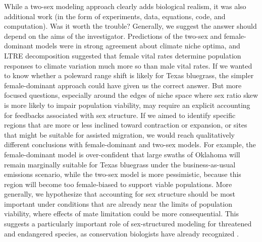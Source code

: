 \documentclass[9pt,twocolumn,twoside,lineno]{pnas-new}
\begin{document}
While a two-sex modeling approach clearly adds biological realism, it was also additional work (in the form of experiments, data, equations, code, and computation). 
Was it worth the trouble? 
Generally, we suggest the answer should depend on the aims of the investigator. 
Predictions of the two-sex and female-dominant models were in strong agreement about climate niche optima, and LTRE decomposition suggested that female vital rates determine population responses to climate variation much more so than male vital rates. 
If we wanted to know whether a poleward range shift is likely for Texas bluegrass, the simpler female-dominant approach could have given us the correct answer. 
But more focused questions, especially around the edges of niche space where sex ratio skew is more likely to impair population viability, may require an explicit accounting for feedbacks associated with sex structure. 
If we aimed to identify specific regions that are more or less inclined toward contraction or expansion, or sites that might be suitable for assisted migration, we would reach qualitatively different conclusions with female-dominant and two-sex models. 
For example, the female-dominant model is over-confident that large swaths of Oklahoma will remain marginally suitable for Texas bluegrass under the business-as-usual emissions scenario, while the two-sex model is more pessimistic, because this region will become too female-biased to support viable populations. 
More generally, we hypothesize that accounting for sex structure should be most important under conditions that are already near the limits of population viability, where effects of mate limitation could be more consequential. 
This suggests a particularly important role of sex-structured modeling for threatened and endangered species, as conservation biologists have already recognized \citep{milner1994population,jenouvrier2012effects}. 
\end{document}
